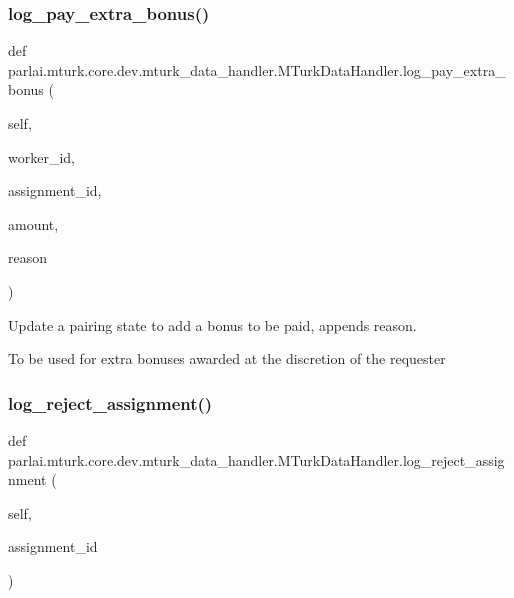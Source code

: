 \subsubsection{\texorpdfstring{log\+\_\+pay\+\_\+extra\+\_\+bonus()}{log\_pay\_extra\_bonus()}}
{\footnotesize\ttfamily def parlai.\+mturk.\+core.\+dev.\+mturk\+\_\+data\+\_\+handler.\+M\+Turk\+Data\+Handler.\+log\+\_\+pay\+\_\+extra\+\_\+bonus (\begin{DoxyParamCaption}\item[{}]{self,  }\item[{}]{worker\+\_\+id,  }\item[{}]{assignment\+\_\+id,  }\item[{}]{amount,  }\item[{}]{reason }\end{DoxyParamCaption})}

\begin{DoxyVerb}Update a pairing state to add a bonus to be paid, appends reason.

To be used for extra bonuses awarded at the discretion of the requester
\end{DoxyVerb}
 \mbox{\label{classparlai_1_1mturk_1_1core_1_1dev_1_1mturk__data__handler_1_1MTurkDataHandler_afd8d5abb26cbd00f96ff7d8ad44b1f49}} 
\subsubsection{\texorpdfstring{log\+\_\+reject\+\_\+assignment()}{log\_reject\_assignment()}}
{\footnotesize\ttfamily def parlai.\+mturk.\+core.\+dev.\+mturk\+\_\+data\+\_\+handler.\+M\+Turk\+Data\+Handler.\+log\+\_\+reject\+\_\+assignment (\begin{DoxyParamCaption}\item[{}]{self,  }\item[{}]{assignment\+\_\+id }\end{DoxyParamCaption})}

